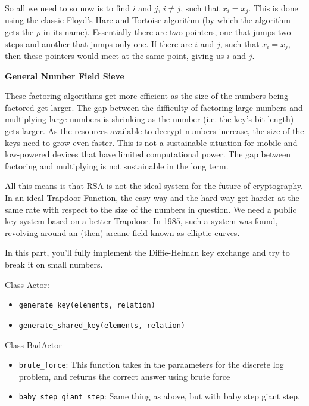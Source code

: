 \documentclass{article}
\begin{document}
So all we need to so now is to find $i$ and $j$, $i \neq j$, such that $x_i = x_j$. This is done using the classic Floyd's Hare and Tortoise algorithm (by which the algorithm gets the $\rho$ in its name). Essentially there are two pointers, one that jumps two steps and another that jumps only one. If there are $i$ and $j$, such that $x_i = x_j$, then these pointers would meet at the same point, giving us $i$ and $j$.


\begin{center}
    \textbf{General Number Field Sieve}
\end{center}

These factoring algorithms get more efficient as the size of the numbers being factored get larger. The gap between the difficulty of factoring large numbers and multiplying large numbers is shrinking as the number (i.e. the key's bit length) gets larger. As the resources available to decrypt numbers increase, the size of the keys need to grow even faster. This is not a sustainable situation for mobile and low-powered devices that have limited computational power. The gap between factoring and multiplying is not sustainable in the long term.

All this means is that RSA is not the ideal system for the future of cryptography. In an ideal Trapdoor Function, the easy way and the hard way get harder at the same rate with respect to the size of the numbers in question. We need a public key system based on a better Trapdoor. In 1985, such a system was found, revolving around an (then) arcane field known as elliptic curves.

\begin{tcolorbox}
    In this part, you'll fully implement the Diffie-Helman key exchange and try to break it on small numbers.

    Class Actor:
    \begin{itemize}
        \item \lstinline{generate_key(elements, relation)}
        \item \lstinline{generate_shared_key(elements, relation)}
    \end{itemize}

    Class BadActor
    \begin{itemize}
            \item \lstinline{brute_force}: This function takes in the paraameters for the discrete log problem, and returns the correct answer using brute force
            \item \lstinline{baby_step_giant_step}: Same thing as above, but with baby step giant step.
        \end{itemize}
\end{tcolorbox}
\end{document}
